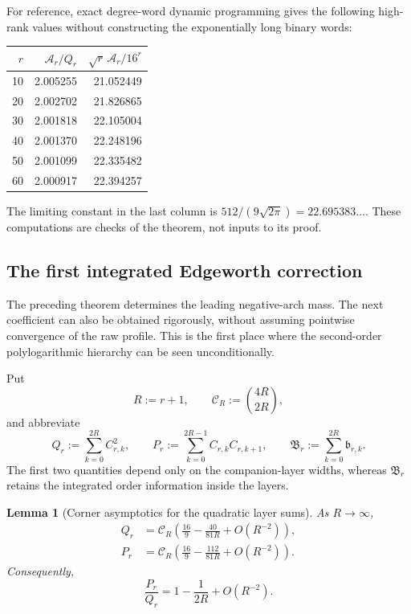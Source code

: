 \documentclass[11pt]{article}
\newtheorem{lemma}[theorem]{Lemma}
\theoremstyle{definition}
\theoremstyle{remark}
\begin{document}
For reference, exact degree-word dynamic programming gives the following
high-rank values without constructing the exponentially long binary words:
\begin{center}
\begin{tabular}{@{}r r r@{}}
\toprule
$r$&$\mathcal A_r/Q_r$&$\sqrt r\,\mathcal A_r/16^r$\\
\midrule
10&2.005255&21.052449\\
20&2.002702&21.826865\\
30&2.001818&22.105004\\
40&2.001370&22.248196\\
50&2.001099&22.335482\\
60&2.000917&22.394257\\
\bottomrule
\end{tabular}
\end{center}
The limiting constant in the last column is
\(512/(9\sqrt{2\pi})=22.695383\ldots\).  These computations are checks of
the theorem, not inputs to its proof.


\subsection{The first integrated Edgeworth correction}
\label{subsec:first-integrated-edgeworth}

The preceding theorem determines the leading negative-arch mass.  The next
coefficient can also be obtained rigorously, without assuming pointwise
convergence of the raw profile.  This is the first place where the
second-order polylogarithmic hierarchy can be seen unconditionally.

Put
\[
 R:=r+1,
 \qquad
 \mathscr C_R:=\binom{4R}{2R},
\]
and abbreviate
\begin{equation}
 Q_r:=\sum_{k=0}^{2R} C_{r,k}^2,
 \qquad
 P_r:=\sum_{k=0}^{2R-1}C_{r,k}C_{r,k+1},
 \qquad
 \mathfrak B_r:=\sum_{k=0}^{2R}\mathfrak b_{r,k}.
 \label{eq:QPB-def}
\end{equation}
The first two quantities depend only on the companion-layer widths, whereas
\(\mathfrak B_r\) retains the integrated order information inside the
layers.

\begin{lemma}[Corner asymptotics for the quadratic layer sums]
\label{lem:QP-corner-asymptotics}
As \(R\to\infty\),
\begin{align}
 Q_r
 &=\mathscr C_R
 \left(
 \frac{16}{9}-\frac{40}{81R}+O(R^{-2})
 \right),
 \label{eq:Q-corner-expansion}\\
 P_r
 &=\mathscr C_R
 \left(
 \frac{16}{9}-\frac{112}{81R}+O(R^{-2})
 \right).
 \label{eq:P-corner-expansion}
\end{align}
Consequently,
\begin{equation}
 \frac{P_r}{Q_r}
 =1-\frac{1}{2R}+O(R^{-2}).
 \label{eq:P-over-Q-expansion}
\end{equation}
\end{lemma}
\end{document}
